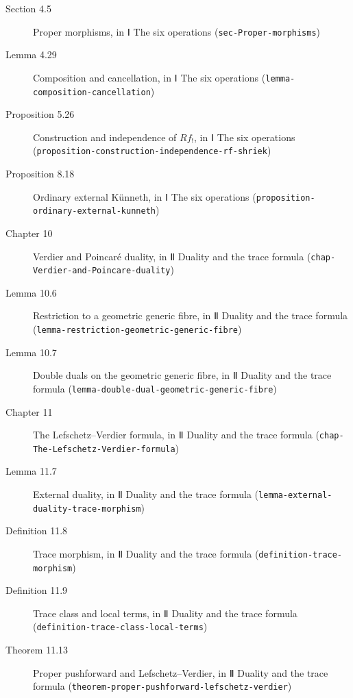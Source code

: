 \documentclass[11pt]{article}
\newcommand{\bpslug}[1]{\texttt{#1}}
\begin{document}
\begin{description}
\item[Section 4.5] Proper morphisms, in Ⅰ The six operations (\bpslug{sec-{}\allowbreak{}Proper-{}\allowbreak{}morphisms})
\item[Lemma 4.29] Composition and cancellation, in Ⅰ The six operations (\bpslug{lemma-{}\allowbreak{}composition-{}\allowbreak{}cancellation})
\item[Proposition 5.26] Construction and independence of $Rf_!$, in Ⅰ The six operations (\bpslug{proposition-{}\allowbreak{}construction-{}\allowbreak{}independence-{}\allowbreak{}rf-{}\allowbreak{}shriek})
\item[Proposition 8.18] Ordinary external Künneth, in Ⅰ The six operations (\bpslug{proposition-{}\allowbreak{}ordinary-{}\allowbreak{}external-{}\allowbreak{}kunneth})
\item[Chapter 10] Verdier and Poincaré duality, in Ⅱ Duality and the trace formula (\bpslug{chap-{}\allowbreak{}Verdier-{}\allowbreak{}and-{}\allowbreak{}Poincare-{}\allowbreak{}duality})
\item[Lemma 10.6] Restriction to a geometric generic fibre, in Ⅱ Duality and the trace formula (\bpslug{lemma-{}\allowbreak{}restriction-{}\allowbreak{}geometric-{}\allowbreak{}generic-{}\allowbreak{}fibre})
\item[Lemma 10.7] Double duals on the geometric generic fibre, in Ⅱ Duality and the trace formula (\bpslug{lemma-{}\allowbreak{}double-{}\allowbreak{}dual-{}\allowbreak{}geometric-{}\allowbreak{}generic-{}\allowbreak{}fibre})
\item[Chapter 11] The Lefschetz–Verdier formula, in Ⅱ Duality and the trace formula (\bpslug{chap-{}\allowbreak{}The-{}\allowbreak{}Lefschetz-{}\allowbreak{}Verdier-{}\allowbreak{}formula})
\item[Lemma 11.7] External duality, in Ⅱ Duality and the trace formula (\bpslug{lemma-{}\allowbreak{}external-{}\allowbreak{}duality-{}\allowbreak{}trace-{}\allowbreak{}morphism})
\item[Definition 11.8] Trace morphism, in Ⅱ Duality and the trace formula (\bpslug{definition-{}\allowbreak{}trace-{}\allowbreak{}morphism})
\item[Definition 11.9] Trace class and local terms, in Ⅱ Duality and the trace formula (\bpslug{definition-{}\allowbreak{}trace-{}\allowbreak{}class-{}\allowbreak{}local-{}\allowbreak{}terms})
\item[Theorem 11.13] Proper pushforward and Lefschetz–Verdier, in Ⅱ Duality and the trace formula (\bpslug{theorem-{}\allowbreak{}proper-{}\allowbreak{}pushforward-{}\allowbreak{}lefschetz-{}\allowbreak{}verdier})

\end{description}
\end{document}
